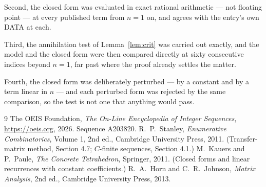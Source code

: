 \documentclass[11pt,a4paper]{article}
\theoremstyle{plain}
\theoremstyle{definition}
\begin{document}
Second, the closed form was evaluated in exact rational arithmetic --- not floating point ---
at every published term from $n=1$ on, and agrees with the entry's own DATA at each.

Third, the annihilation test of Lemma~\ref{lem:crit} was carried out exactly, and the model
and the closed form were then compared directly at sixty consecutive indices beyond
$n=1$, far past where the proof already settles the matter.

Fourth, the closed form was deliberately perturbed --- by a constant and by a term linear in
$n$ --- and each perturbed form was rejected by the same comparison, so the test is not one
that anything would pass.

\begin{thebibliography}{9}
 The OEIS Foundation, \emph{The On-Line Encyclopedia of Integer
Sequences}, \url{https://oeis.org}, 2026. Sequence A203820.
 R.~P.~Stanley, \emph{Enumerative Combinatorics}, Volume 1, 2nd ed.,
Cambridge University Press, 2011. (Transfer-matrix method, Section 4.7; $C$-finite sequences,
Section 4.1.)
 M.~Kauers and P.~Paule, \emph{The Concrete Tetrahedron}, Springer, 2011.
(Closed forms and linear recurrences with constant coefficients.)
 R.~A.~Horn and C.~R.~Johnson, \emph{Matrix Analysis}, 2nd ed., Cambridge
University Press, 2013.
\end{thebibliography}
\end{document}
